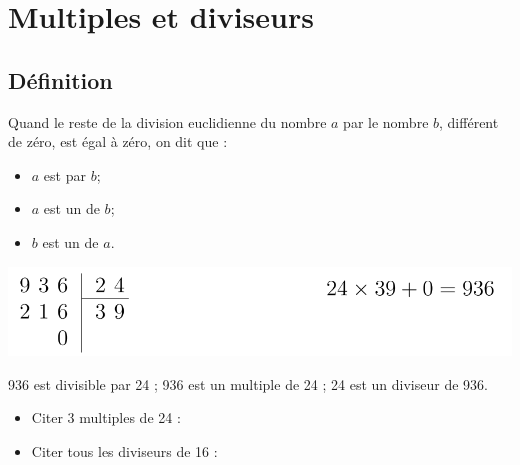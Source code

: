 \documentclass[xcolor={dvipsnames}]{beamer}
\begin{document}
\section{Multiples et diviseurs}

\subsection{Définition}

\begin{frame}
	\begin{mydefs}
	
			Quand le reste de la division euclidienne du nombre $a$ par le nombre $b$, différent de zéro, est égal à zéro, on dit que : \pause
			
			\begin{itemize}
				\item $a$ est \pause {} par $b$; \pause
				\item $a$ est \pause un  de $b$; \pause
				\item $b$ est \pause un  de $a$. \pause
			\end{itemize}
		
	\end{mydefs}

\begin{myex}
	
	\begin{center}
		\includegraphics[scale=0.3]{../img/div} \pause
	\end{center}
	
	
	936 est divisible par 24 ; 936 est un multiple de 24 ; 24 est un diviseur de 936.\pause
\end{myex}

\begin{myexo}
	\begin{itemize}
		\item Citer 3 multiples de 24 :
		\item Citer tous les diviseurs de 16 :
	\end{itemize}
\end{myexo}

\end{frame}
\end{document}
